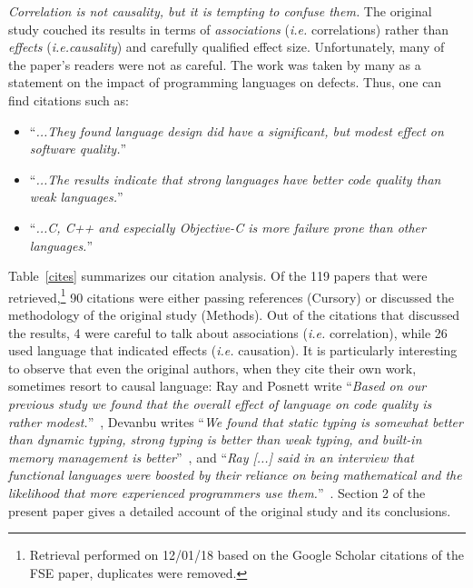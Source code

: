 \documentclass[acmsmall]{acmart}
\renewcommand{\c}{{\sf  C}\xspace}
\newcommand{\objc}{{\sf  Objective-C}\xspace}
\newcommand{\cpp}{{\sf  C++}\xspace}
\newcommand{\ie}{\emph{i.e.}\xspace}
\begin{document}
\emph{Correlation is not causality, but it is tempting to confuse them.}
The original study couched its results in terms of \emph{associations} (\ie
correlations) rather than \emph{effects} (\ie \emph{causality}) and
carefully qualified effect size.  Unfortunately, many of the paper's readers
were not as careful. The work was taken by many as a statement on the impact
of programming languages on defects. Thus, one can find citations such as:
\begin{itemize}
\item ``\emph{...They found language design did have a significant, but
  modest effect on software quality.}''\,\cite{one}
\item ``\emph{...The results indicate that strong languages have better
  code quality than weak languages.}''\,\cite{three} 
\item ``\emph{...\c, \cpp and especially \objc is more failure prone than
  other languages.}''\,\cite{nine}
\end{itemize}

\begin{table}
\caption{Citation analysis}\label{cites}
\vspace{-6mm}
\end{table}

\noindent Table~\ref{cites} summarizes our citation analysis. Of the 119
papers that were retrieved,\footnote{Retrieval performed on 12/01/18 based
  on the Google Scholar citations of the FSE paper, duplicates were
  removed.}  90 citations were either passing references (Cursory) or
discussed the methodology of the original study (Methods). Out of the
citations that discussed the results, 4 were careful to talk about
associations (\ie correlation), while 26 used language that indicated
effects (\ie causation). It is particularly interesting to observe that
even the original authors, when they cite their own work, sometimes resort to
causal language: Ray and Posnett write ``\emph{Based on our previous study
  \cite{ray14} we found that the overall effect of language on code quality
  is rather modest.}''~\cite{book}, Devanbu writes ``\emph{We found that
  static typing is somewhat better than dynamic typing, strong typing is
  better than weak typing, and built-in memory management is
  better}''~\cite{prem}, and ``\emph{Ray [...] said in an interview that
  functional languages were boosted by their reliance on being mathematical
  and the likelihood that more experienced programmers use
  them.}''~\cite{info}.  Section 2 of the present paper gives a detailed
account of the original study and its conclusions.
\end{document}
